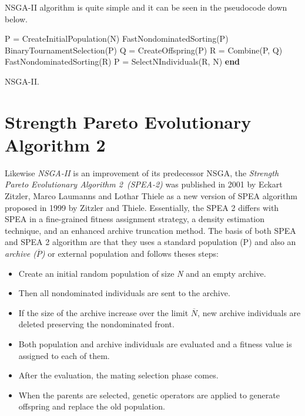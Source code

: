 NSGA-II algorithm is quite simple and it can be seen in the pseudocode down below.

\begin{algorithm}[H]
\begin{algorithmic}[1]
\State P = CreateInitialPopulation(N)\;
\State  FastNondominatedSorting(P)\;
    \State BinaryTournamentSelection(P)\;
    \State Q = CreateOffspring(P)\;
    \State R = Combine(P, Q)\;
    \State FastNondominatedSorting(R)\;
    \State P = SelectNIndividuals(R, N)\;
  \EndWhile
  \State \textbf{end}
\end{algorithmic}
\caption{NSGA-II.}
\end{algorithm}

\section{Strength Pareto Evolutionary Algorithm 2}
Likewise \textit{NSGA-II} is an improvement of its predecessor NSGA, the \textit{Strength Pareto Evolutionary Algorithm 2~(SPEA-2)} was published in 2001 by Eckart Zitzler, Marco Laumanns and Lothar Thiele as a new version of SPEA algorithm proposed in 1999 by Zitzler and Thiele\cite{SPEA2}. Essentially, the SPEA 2 differs with SPEA in a fine-grained fitness assignment strategy, a density estimation technique, and an enhanced archive truncation method\cite{SPEA2}.
The basis of both SPEA and SPEA 2 algorithm are that they uses a standard population (P) and also an \textit{archive ($\overline{P}$)} or external population and follows theses steps:
\begin{itemize}
    \item Create an initial random population of size \textit{N} and an empty archive.
    \item Then all nondominated individuals are sent to the archive.
    \item If the size of the archive increase over the limit $\overline{N}$, new archive individuals are deleted preserving the nondominated front.
    \item Both population and archive individuals are evaluated and a fitness value is assigned to each of them.
    \item After the evaluation, the mating selection phase comes.
    \item When the parents are selected, genetic operators are applied to generate offspring and replace the old population.
\end{itemize}

